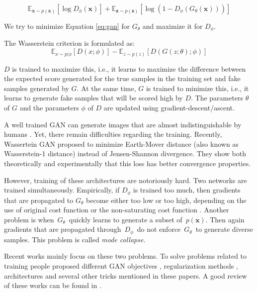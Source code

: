 \documentclass[a4paper,onesided,12pt]{report}
\begin{document}
\begin{equation}
\label{eq:gan}
\mathbb{E}_{\boldsymbol{x} \sim p(\boldsymbol{x})} [ \log{D_{\phi}(\boldsymbol{x})} ] + 
\mathbb{E}_{\boldsymbol{z} \sim p(\boldsymbol{z})} [ \log{(1-D_{\phi}(G_{\theta}(\boldsymbol{x})))} ]
\end{equation} 

We try to minimize Equation \ref{eq:gan} for $G_{\theta}$ and maximize it for $D_{\phi}$.

The Wasserstein criterion \cite{wgan} is formulated as:
\begin{equation}
\mathbb{E}_{x\sim p(x} [D(x;\phi)] - 
    \mathbb{E}_{z\sim p(z)} [D(G(z;\theta);\phi)]
\label{eq:wgan}
\end{equation}

$D$ is trained to maximize this, i.e., it learns to maximize the difference between the expected score generated for the true samples in the training set and fake samples generated by $G$. At the same time, $G$ is trained to minimize this, i.e., it learns to generate fake samples that will be scored high by $D$. The parameters $\theta$ of $G$ and the parameters $\phi$ of $D$ are updated using gradient-descent/ascent. 

A well trained GAN can generate images that are almost indistinguishable by humans \cite{biggan,proggan,stylegan}. Yet, there remain difficulties regarding the training. Recently, Wassertein GAN \cite{wgan} proposed to minimize Earth-Mover distance (also known as Wasserstein-1 distance) instead of Jensen-Shannon divergence. They show both theoretically and experimentally that this loss has better convergence properties.

However, training of these architectures are notoriously hard. Two networks are trained simultaneously. Empirically, if $D_{\phi}$ is trained too much, then gradients that are propagated to $G_{\theta}$ become either too low or too high, depending on the use of original cost function or the non-saturating cost function \cite{principledmethods}. Another problem is when~$G_{\theta}$~quickly learns to generate a subset of~$p(\boldsymbol{x})$. Then again gradients that are propagated through~$D_{\phi}$~do not enforce~$G_{\theta}$~to generate diverse samples. This problem is called \emph{mode collapse}.

Recent works mainly focus on these two problems. To solve problems related to training people proposed different GAN objectives \cite{wgan,infogan,leastgan,lsgan}, regularization methods \cite{improved_wgan,sngan,dcgan}, architectures \cite{biggan,bigan,ali,proggan,stylegan,dcgan,sagan} and several other tricks mentioned in these papers. A good review of these works can be found in \cite{ganreview,ganreview2,ganreview3}.
\end{document}
